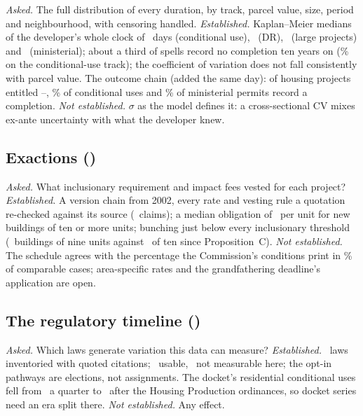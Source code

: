 \documentclass[11pt]{article}
\begin{document}
\textit{Asked.} The full distribution of every duration, by track, parcel value, size, period and
neighbourhood, with censoring handled. \textit{Established.} Kaplan--Meier medians of the
developer's whole clock of \ckTotMedCu\ days (conditional use), \ckTotMedDr\ (DR), \ckTotMedLpa\
(large projects) and \ckTotMedMin\ (ministerial); about a third of spells record no completion ten
years on (\ckTotStenPctCu\% on the conditional-use track); the coefficient of variation does not
fall consistently with parcel value. The outcome chain (added the same day): of housing projects
entitled \ocMatureFrom--\ocMatureTo, \ocDoneCu\% of conditional uses and \ocDoneMin\% of ministerial
permits record a completion. \textit{Not established.} $\sigma$ as the model defines it: a
cross-sectional CV mixes ex-ante uncertainty with what the developer knew.

\subsection{Exactions (\chDateExactions)}\label{sec:chexactions}

\textit{Asked.} What inclusionary requirement and impact fees vested for each project?
\textit{Established.} A version chain from 2002, every rate and vesting rule a quotation re-checked
against its source (\exClaims\ claims); a median obligation of \exPuMed\ per unit for new
buildings of ten or more units; bunching just below every inclusionary threshold (\exNineA\
buildings of nine units against \exTenA\ of ten since Proposition~C). \textit{Not established.}
The schedule agrees with the percentage the Commission's conditions print in \exCrossAgree\% of
comparable cases; area-specific rates and the grandfathering deadline's application are open.

\subsection{The regulatory timeline (\chDateRegulatoryTimeline)}\label{sec:chregulatorytimeline}

\textit{Asked.} Which laws generate variation this data can measure? \textit{Established.}
\rtLaws\ laws inventoried with quoted citations; \rtUsable\ usable, \rtNotMeasurable\ not
measurable here; the opt-in pathways are elections, not assignments. The docket's residential
conditional uses fell from \rtResCuPre\ a quarter to \rtResCuPost\ after the Housing Production
ordinances, so docket series need an era split there. \textit{Not established.} Any effect.
\end{document}
